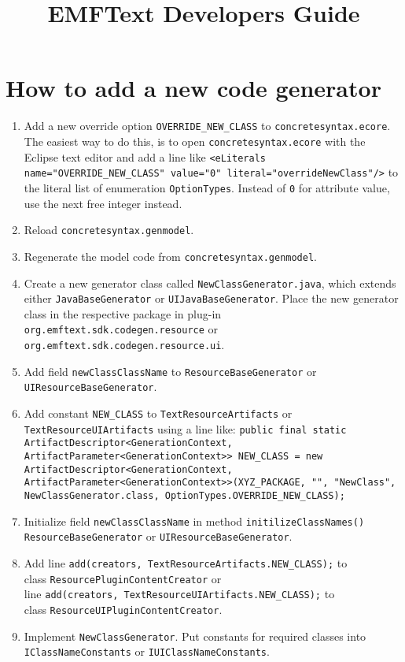 \documentclass{scrartcl}
\title{EMFText Developers Guide}
\begin{document}
\section{How to add a new code generator}

\begin{enumerate}
	\item Add a new override option \texttt{OVERRIDE\_NEW\_CLASS} to 
		  \texttt{concretesyntax.ecore}. The easiest way to do this, is to open
		  \texttt{concretesyntax.ecore} with the Eclipse text editor and add a
		  line like \texttt{<eLiterals name="OVERRIDE\_NEW\_CLASS" value="0"
		  literal="overrideNewClass"/>} to the literal list of enumeration
		  \texttt{OptionTypes}. Instead of \texttt{0} for attribute value, use
		  the next free integer instead.
	\item Reload \texttt{concretesyntax.genmodel}.
	\item Regenerate the model code from \texttt{concretesyntax.genmodel}.
	\item Create a new generator class called \texttt{NewClassGenerator.java},
		  which extends either \texttt{JavaBaseGenerator} or
		  \texttt{UIJavaBaseGenerator}. Place the new generator class in the
		  respective package in plug-in 
		  \texttt{org.emftext.sdk.codegen.resource} or
		  \texttt{org.emftext.sdk.codegen.resource.ui}.
	\item Add field \texttt{newClassClassName} to \texttt{ResourceBaseGenerator}
		  or \texttt{UIResourceBaseGenerator}.
	\item Add constant \texttt{NEW\_CLASS} to \texttt{TextResourceArtifacts} or
		  \texttt{TextResourceUIArtifacts} using a line like:
		  \texttt{public final static ArtifactDescriptor<GenerationContext,
	ArtifactParameter<GenerationContext>> NEW\_CLASS = new
	ArtifactDescriptor<GenerationContext,
	ArtifactParameter<GenerationContext>>(XYZ\_PACKAGE, "", "NewClass",
	NewClassGenerator.class, OptionTypes.OVERRIDE\_NEW\_CLASS);}
	
	\item Initialize field \texttt{newClassClassName} in method
		  \texttt{initilizeClassNames()} \texttt{ResourceBaseGenerator} or
		  \texttt{UIResourceBaseGenerator}.
		  
	\item Add line \texttt{add(creators, TextResourceArtifacts.NEW\_CLASS);} to\\
		  class \texttt{ResourcePluginContentCreator} or \\
	line \texttt{add(creators, TextResourceUIArtifacts.NEW\_CLASS);} to\\ 
		  class \texttt{ResourceUIPluginContentCreator}.
		  
	\item Implement \texttt{NewClassGenerator}. Put constants for required
		  classes into \texttt{IClassNameConstants} or 
		  \texttt{IUIClassNameConstants}.
\end{enumerate}
\end{document}
